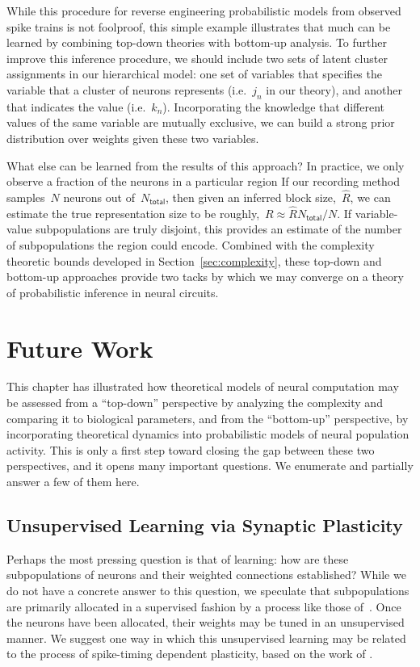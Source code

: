 While this procedure for reverse engineering probabilistic models
from observed spike trains is not foolproof, this simple example
illustrates that much can be learned by combining top-down theories
with bottom-up analysis. To further improve this inference procedure,
we should include two sets of latent cluster assignments in our
hierarchical model: one set of variables that specifies the
variable that a cluster of neurons represents (i.e.~$j_n$ in our
theory), and another that indicates the value (i.e.~$k_n$).
Incorporating the knowledge that different values of the same variable
are mutually exclusive, we can build a strong prior distribution
over weights given these two variables. 

What else can be learned from the results of this approach? In
practice, we only observe a fraction of the neurons in a particular
region If our recording method samples~$N$ neurons out
of~$N_{\mathsf{total}}$, then given an inferred block
size,~$\widehat{R}$, we can estimate the true representation size to
be roughly,~$R\approx \widehat{R} N_{\mathsf{total}} / N$. If variable-value
subpopulations are truly disjoint, this provides an estimate of the
number of subpopulations the region could encode. Combined with the
complexity theoretic bounds developed in Section~\ref{sec:complexity},
these top-down and bottom-up approaches provide two tacks  by which we may 
converge on a theory of probabilistic inference in neural circuits.

\section{Future Work}

This chapter has illustrated how theoretical models of neural computation
may be assessed from a ``top-down'' perspective by analyzing the complexity
and comparing it to biological parameters, and from the ``bottom-up'' perspective,
by incorporating theoretical dynamics into probabilistic models of neural
population activity. This is only a first step toward closing the gap
between these two perspectives, and it opens many important questions.
We enumerate and partially answer a few of them here.

\subsection{Unsupervised Learning via Synaptic Plasticity}
\label{sec:learning}
Perhaps the most pressing question is that of learning: how are these
subpopulations of neurons and their weighted connections established?
While we do not have a concrete answer to this question, we
speculate that subpopulations are primarily allocated in a supervised
fashion by a process like those of~\citet{valiant1994circuits}.
Once the neurons have been allocated, their weights may be tuned
in an unsupervised manner. We suggest one way in which this unsupervised
learning may be related to the process of spike-timing dependent
plasticity, based on the work of \citet{nessler2013bayesian}.

